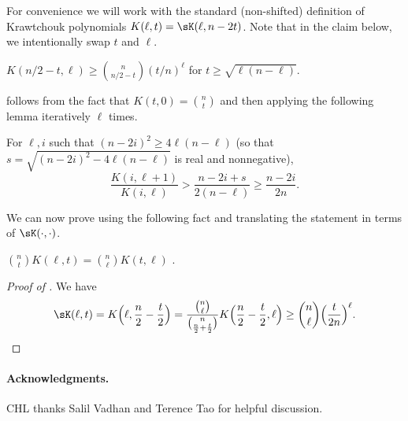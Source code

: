 For convenience we will work with the standard (non-shifted) definition of Krawtchouk polynomials $K(\ell,t) = \sK(\ell,n-2t)$.
Note that in the claim below, we intentionally swap $t$ and $\ell$.
\begin{claim} \label{claim:K-lb}
  $K(n/2-t,\ell) \ge \binom{n}{n/2-t} (t/n)^\ell$ for $t \ge \sqrt{\ell(n-\ell)}$.
\end{claim}

 follows from the fact that $K(t,0) = \binom{n}{t}$ and then applying the following lemma iteratively $\ell$ times.

\begin{lemma}
  For $\ell,i$ such that $(n-2i)^2 \ge 4\ell(n-\ell)$ (so that $s = \sqrt{(n-2i)^2 - 4\ell(n-\ell)}$ is real and nonnegative),
  \[
    \frac{K(i,\ell+1)}{K(i,\ell)} > \frac{n-2i+s}{2(n-\ell)} \ge \frac{n-2i}{2n} .
  \]
\end{lemma}

We can now prove  using the following fact and translating the statement in terms of $\sK(\cdot,\cdot)$.
\begin{fact}
  $\binom{n}{t} K(\ell,t) = \binom{n}{\ell} K(t,\ell)$ .
\end{fact}

\begin{proof}[Proof of ]
  We have
  \[
    \sK(\ell,t)
    = K\Bigl(\ell,\frac{n}{2}-\frac{t}{2}\Bigr)
    = \frac{\binom{n}{\ell}}{\binom{n}{\frac{n}{2}+\frac{t}{2}}} K\Bigl(\frac{n}{2}-\frac{t}{2},\ell\Bigr)
    \ge \binom{n}{\ell} \Bigl(\frac{t}{2n}\Bigr)^\ell . \qedhere
  \]
\end{proof}



\paragraph{Acknowledgments.} CHL thanks Salil Vadhan and Terence Tao for helpful discussion.























